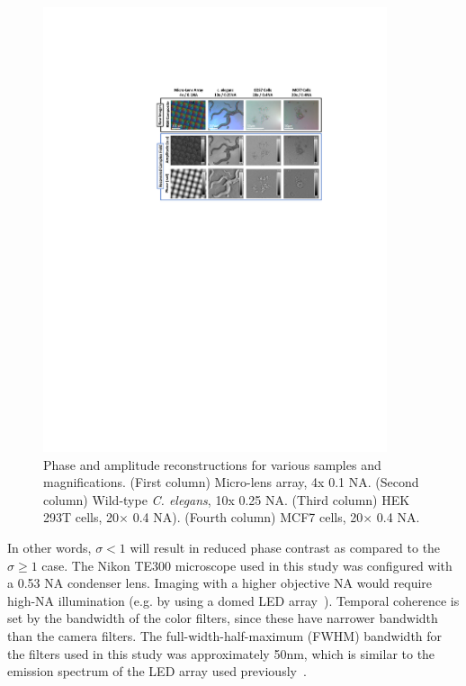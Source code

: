 \begin{figure}[htb]
\centering
\includegraphics[width=0.9\textwidth]{figures/fig_cdpc_video.pdf}
\caption{\label{fig:mosaic}
Phase and amplitude reconstructions for various samples and magnifications. (First column) Micro-lens array, 4x 0.1 NA. (Second column) Wild-type \textit{C. elegans}, 10x 0.25 NA. (Third column) HEK 293T cells, 20$\times$ 0.4 NA). (Fourth column) MCF7 cells, 20$\times$ 0.4 NA.}
\end{figure}


\noindent In other words, $\sigma < 1$ will result in reduced phase contrast as compared to the $\sigma \geq 1$ case. The Nikon TE300 microscope used in this study was configured with a 0.53 NA condenser lens. Imaging with a higher objective NA would require high-NA illumination (e.g. by using a domed LED array~\cite{phillips2015multi}). Temporal coherence is set by the bandwidth of the color filters, since these have narrower bandwidth than the camera filters. The full-width-half-maximum (FWHM) bandwidth for the filters used in this study was approximately 50nm, which is similar to the emission spectrum of the LED array used previously~\cite{tian2015quantitative}.

